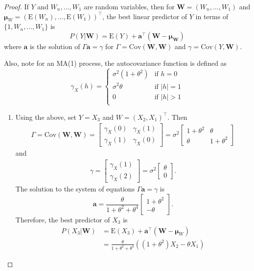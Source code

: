 \documentclass[12pt]{article}
\theoremstyle{definition}
\newcommand{\E}{\text{E}}
\newcommand{\Co}[2]{\text{Cov}({#1}, {#2})}
\newcommand{\vect}[1]{\boldsymbol{#1}}
\begin{document}
\begin{proof}
  If $Y$ and $W_n, \dots, W_1$ are random variables, then for $\vect{W} = (W_n, \dots, W_1)$
  and $\vect{\mu}_W= \left(\E(W_n), \dots, \E(W_1)\right)^\intercal$, the best linear
  predictor of $Y$ in terms of $\{1, W_n, \dots, W_1\}$ is
  \[
    P(Y|\vect{W}) = \E(Y) + \vect{a}^\intercal (\vect{W} - \vect{\mu_W})
  \]
  where $\vect{a}$ is the solution of $\Gamma \vect{a} = \gamma$ for
  $\Gamma = \Co{\vect{W}}{\vect{W}}$ and $\gamma = \Co{Y}{\vect{W}}$.

  Also, note for an MA(1) process, the autocovariance function is defined as
  \[
    \gamma_X(h) =
    \begin{cases}
      \sigma^2 (1 + \theta^2) & \text{if $h = 0$}\\
      \sigma^2 \theta & \text{if $|h| = 1$}\\
      0 & \text{if $|h| > 1$}\\
    \end{cases}
  \]
  \begin{enumerate}
    \item Using the above, set $Y = X_3$ and $W = (X_2, X_1)^\intercal$. Then
      \begin{align*}
        \Gamma = \Co{\vect{W}}{\vect{W}} =
        \begin{bmatrix} \gamma_X(0) & \gamma_X(1) \\ \gamma_X(1) & \gamma_X(0) \end{bmatrix} =
        \sigma^2 \begin{bmatrix} 1 + \theta^2 & \theta \\ \theta & 1 + \theta^2 \end{bmatrix}
      \end{align*}
      and
      \begin{align*}
        \gamma = \begin{bmatrix} \gamma_X(1) \\ \gamma_X(2) \end{bmatrix}
        = \sigma^2 \begin{bmatrix} \theta \\ 0 \end{bmatrix}.
      \end{align*}
      The solution to the system of equations $\Gamma \vect{a} = \gamma$ is
      $$\vect{a} = \frac{\theta}{1 + \theta^2 + \theta^4} \begin{bmatrix}1 + \theta^2 \\ -\theta\end{bmatrix}.$$
      Therefore, the best predictor of $X_3$ is
      \begin{align*}
        P(X_3|\vect{W}) &= \E(X_3) + \vect{a}^\intercal (\vect{W} - \vect{\mu}_W) \\
        &= \frac{\theta}{1 + \theta^2 + \theta^4} ((1 + \theta^2) X_2 - \theta X_1)
      \end{align*}


\end{enumerate}
\end{proof}
\end{document}
